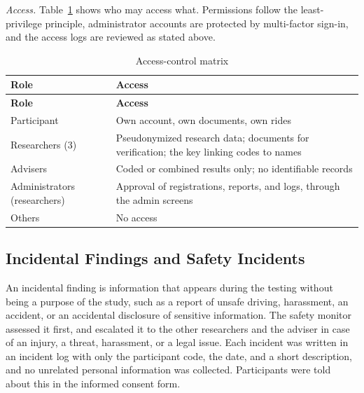 \textit{Access.} Table~\ref{tab:access} shows who may access what. Permissions follow the least-privilege principle, administrator accounts are protected by multi-factor sign-in, and the access logs are reviewed as stated above.

\begin{footnotesize}
\begin{longtable}{p{}p{}}
\caption[Access-control matrix]{Access-control matrix}\label{tab:access}\\
\hline
\textbf{Role} & \textbf{Access} \\ \hline
\endfirsthead
\hline
\textbf{Role} & \textbf{Access} \\ \hline
\endhead
Participant & Own account, own documents, own rides \\ \hline
Researchers (3) & Pseudonymized research data; documents for verification; the key linking codes to names \\ \hline
Advisers & Coded or combined results only; no identifiable records \\ \hline
Administrators (researchers) & Approval of registrations, reports, and logs, through the admin screens \\ \hline
Others & No access \\ \hline
\end{longtable}
\end{footnotesize}

\subsection[Incidental Findings and Safety Incidents]{Incidental Findings and Safety Incidents}\label{sec:incidental}
An incidental finding is information that appears during the testing without being a purpose of the study, such as a report of unsafe driving, harassment, an accident, or an accidental disclosure of sensitive information. The safety monitor assessed it first, and escalated it to the other researchers and the adviser in case of an injury, a threat, harassment, or a legal issue. Each incident was written in an incident log with only the participant code, the date, and a short description, and no unrelated personal information was collected. Participants were told about this in the informed consent form.

